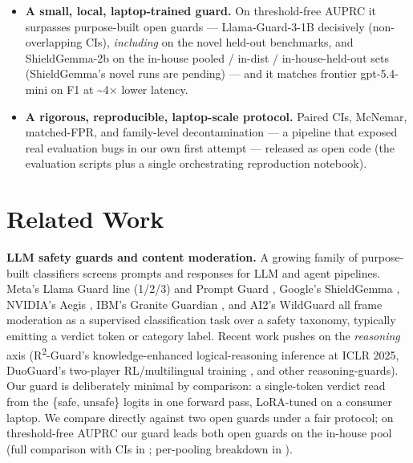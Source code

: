 \documentclass[sigconf,nonacm]{acmart}
\begin{document}
\begin{itemize}
  \item \textbf{A small, local, laptop-trained guard.} On threshold-free AUPRC it surpasses purpose-built open guards --- Llama-Guard-3-1B decisively (non-overlapping CIs), \emph{including} on the novel held-out benchmarks, and ShieldGemma-2b on the in-house pooled / in-dist / in-house-held-out sets (ShieldGemma's novel runs are pending) --- and it matches frontier gpt-5.4-mini on F1 at \textasciitilde{}4$\times$ lower latency.
  \item \textbf{A rigorous, reproducible, laptop-scale protocol.} Paired CIs, McNemar, matched-FPR, and family-level decontamination --- a pipeline that exposed real evaluation bugs in our own first attempt --- released as open code (the evaluation scripts plus a single orchestrating reproduction notebook).
\end{itemize}

\section{Related Work}

\textbf{LLM safety guards and content moderation.} A growing family of purpose-built classifiers screens prompts and responses for LLM and agent pipelines. Meta's Llama Guard line (1/2/3) \cite{inan2023llamaguard,meta2024llamaguard2_3,fedorov2024llamaguard3_1b} and Prompt Guard \cite{meta2024promptguard}, Google's ShieldGemma \cite{zeng2024shieldgemma}, NVIDIA's Aegis \cite{ghosh2024aegis}, IBM's Granite Guardian \cite{padhi2024graniteguardian}, and AI2's WildGuard \cite{han2024wildguard} all frame moderation as a supervised classification task over a safety taxonomy, typically emitting a verdict token or category label. Recent work pushes on the \emph{reasoning} axis (R\textsuperscript{2}-Guard's knowledge-enhanced logical-reasoning inference \cite{kang2025r2guard} at ICLR 2025, DuoGuard's two-player RL/multilingual training \cite{deng2025duoguard}, and other reasoning-guards). Our guard is deliberately minimal by comparison: a single-token verdict read from the \{safe, unsafe\} logits in one forward pass, LoRA-tuned on a consumer laptop. We compare directly against two open guards under a fair protocol; on threshold-free AUPRC our guard leads both open guards on the in-house pool (full comparison with CIs in ; per-pooling breakdown in ).
\end{document}
